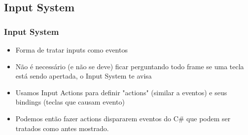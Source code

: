 \documentclass{beamer}
\begin{document}
	\subsection{Input System}
	\begin{frame}
		\frametitle{Input System}

		\begin{itemize}
			\item Forma de tratar inputs como eventos

			\item Não é necessário (e não se deve) ficar perguntando todo frame
				se uma tecla está sendo apertada, o Input System te avisa

			\item Usamos Input Actions para definir "actions" (similar a
				eventos) e seus bindings (teclas que causam evento)

			\item Podemos então fazer actions dispararem eventos do C\# que
				podem ser tratados como antes mostrado.
		\end{itemize}
	\end{frame}
\end{document}
